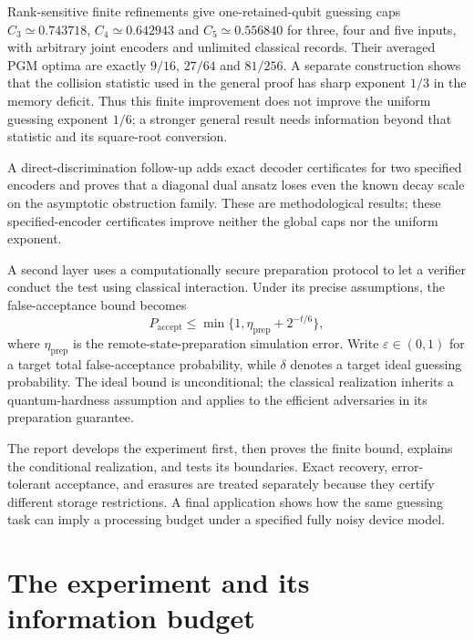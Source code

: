 \documentclass[11pt,a4paper]{article}
\newcommand{\newsection}[1]{\section{#1}}
\begin{document}
Rank-sensitive finite refinements give one-retained-qubit guessing caps $C_3\simeq0.743718$, $C_4\simeq0.642943$ and $C_5\simeq0.556840$ for three, four and five inputs, with arbitrary joint encoders and unlimited classical records. Their averaged PGM optima are exactly $9/16$, $27/64$ and $81/256$. A separate construction shows that the collision statistic used in the general proof has sharp exponent $1/3$ in the memory deficit. Thus this finite improvement does not improve the uniform guessing exponent $1/6$; a stronger general result needs information beyond that statistic and its square-root conversion.

A direct-discrimination follow-up adds exact decoder certificates for two specified encoders and proves that a diagonal dual ansatz loses even the known decay scale on the asymptotic obstruction family. These are methodological results; these specified-encoder certificates improve neither the global caps nor the uniform exponent.

A second layer uses a computationally secure preparation protocol to let a verifier conduct the test using classical interaction. Under its precise assumptions, the false-acceptance bound becomes
\begin{equation}\label{eq:compiled-front}
P_{\mathrm{accept}}\leq\min\{1,\eta_{\mathrm{prep}}+2^{-t/6}\},
\end{equation}
where $\eta_{\mathrm{prep}}$ is the remote-state-preparation simulation error. Write $\varepsilon\in(0,1)$ for a target total false-acceptance probability, while $\delta$ denotes a target ideal guessing probability. The ideal bound is unconditional; the classical realization inherits a quantum-hardness assumption and applies to the efficient adversaries in its preparation guarantee.

The report develops the experiment first, then proves the finite bound, explains the conditional realization, and tests its boundaries. Exact recovery, error-tolerant acceptance, and erasures are treated separately because they certify different storage restrictions. A final application shows how the same guessing task can imply a processing budget under a specified fully noisy device model.

\newsection{The experiment and its information budget}
\end{document}

